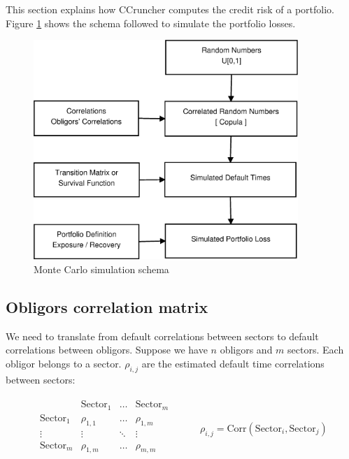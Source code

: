 \documentclass[a4paper,12pt,final]{article}
\begin{document}
This section explains how CCruncher computes the credit risk of a portfolio.
Figure \ref{fig:mcschema1} shows the schema followed to simulate the 
portfolio losses.

\begin{figure}[!hb]
\begin{center}
\includegraphics[width=10cm,angle=0]{./images/esquema1.eps}
\caption{Monte Carlo simulation schema}
\label{fig:mcschema1}
\end{center}
\end{figure}

\subsection{Obligors correlation matrix}
\label{tcorrel}
We need to translate from default correlations between sectors to default 
correlations between obligors. Suppose we have $n$ obligors and $m$ 
sectors. Each obligor belongs to a sector. $\rho_{i,j}$ are the estimated 
default time correlations between sectors:

\begin{center}
\begin{displaymath}
\begin{array}{cc}
\begin{array}{c|ccc}
                    & \mathrm{Sector}_1 & \dots  & \mathrm{Sector}_{m} \\
\hline
\mathrm{Sector}_1   & \rho_{1,1}        & \dots  & \rho_{1,m} \\
\vdots              & \vdots            & \ddots & \vdots     \\
\mathrm{Sector}_{m} & \rho_{1,m}        & \dots  & \rho_{m,m} \\
\end{array}
&
\qquad \rho_{i,j} = \mathrm{Corr}(\mathrm{Sector}_i, \mathrm{Sector}_j)
\end{array}
\end{displaymath}
\end{center}
\end{document}
